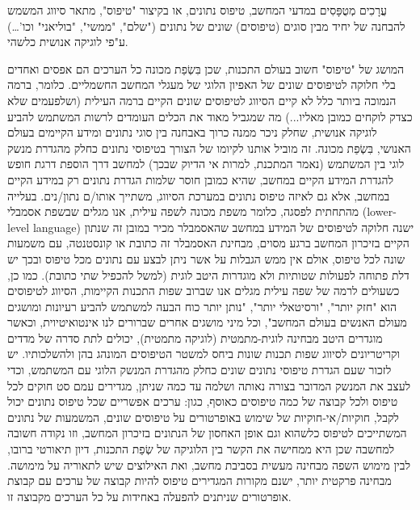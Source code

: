 \begin{טבלא}[!htbp]
      עֲרָכִים מְטֻפָּסִים
      במדעי המחשב, טיפוס נתונים, או בקיצור "טיפוס", מתאר סיווג המשמש להבחנה של יחיד מבין סוגים (טיפוסים) שונים של נתונים ("שלם", "ממשי", "בוליאני" וכו'…) ע"פי לוגיקה אנושית כלשהי.

      המושג של "טיפוס" חשוב בעולם התכנות, שכן בִּשְׂפַת מכונה כל הערכים הם אפסים ואחדים
      בלי חלוקה לטיפוסים שונים של האפיון הלוגי של מעגלי המחשב החשמליים. כלומר, ברמה
      הנמוכה ביותר כלל לא קיים הסיווג לטיפוסים שונים הקיים ברמה העילית (ושלפעמים שלא
      כצדק לוקחים כמובן מאליו...) מה שמגביל מאוד את הכלים העומדים לרשות המשתמש להביע
      לוגיקה אנושית, שחלק ניכר ממנה כרוך באבחנה בין סוגי נתונים ומידע הקיימים בעולם
      האנושי, בִּשְׂפַת מכונה. זה מוביל אותנו לקיומו של הצורך בטיפוסי נתונים כחלק מהגדרת
      מנשק לוגי בין המשתמש (נאמר המתכנת, למרות אי הדיוק שבכך) למחשב דרך הוספת דרגת
      חופש להגדרת המידע הקיים במחשב, שהיא כמובן חוסר שלמות הגדרת נתונים רק במידע
      הקיים במחשב, אלא גם לאיזה טיפוס נתונים במערכת הסיווג, משתייך אותו/ם נתון/נים.
      בעלייה מהתחתית לפסגה, כלומר משפת מכונה לשפה עילית, אנו מגלים שבשפת אסמבלי
      (lower-level language) ישנה חלוקה לטיפוסים של המידע במחשב שהאסמבלר מכיר במובן
      זה שנתון הקיים בזיכרון המחשב ברגע מסוים, מבחינת האסמבלר זה כתובת או קונסטנטה,
      עם משמעות שונה לכל טיפוס, אולם אין ממש הגבלות על אשר ניתן לבצע עם נתונים מכל
      טיפוס ובכך יש דלת פתוחה לפעולות שטותיות ולא מוגדרות היטב לוגית (למשל להכפיל שתי
      כתובת). כמו כן, כשעולים לרמה של שפה עילית מגלים אנו שברוב שפות התכנות הקיימות,
      הסיווג לטיפוסים הוא "חזק יותר", "ורסיטאלי יותר", "נותן יותר כוח הבעה למשתמש
      להביע רעיונות ומושגים מעולם האנשים בעולם המחשב", וכל מיני מושגים אחרים שברורים
      לנו אינטואיטיוית, וכאשר מוגדרים היטב מבחינה לוגית-מתמטית (לוגיקה מתמטית),
      יכולים לתת סדרה של מדדים וקריטריונים לסיווג שפות תכנות שונות ביחס למשטר
      הטיפוסים המונהג בהן ולהשלכותיו. יש לזכור שעם הגדרת טיפוסי נתונים שונים כחלק
      מהגדרת המנשק הלוגי עם המשתמש, וכדי לעצב את המנשק המדובר בצורה נאותה ושלמה עד
      כמה שניתן, מגדירים עמם סט חוקים לכל טיפוס ולכל קבוצה של כמה טיפוסים כאוסף,
      כגון: ערכים אפשריים שכל טיפוס נתונים יכול לקבל, חוקיות/אי-חוקיות של שימוש
      באופרטורים על טיפוסים שונים, המשמעות של נתונים המשתייכים לטיפוס כלשהוא וגם אופן
      האחסון של הנתונים בזיכרון המחשב, וזו נקודה חשובה למחשבה שכן היא ממחישה את הקשר
      בין הלוגיקה של שְׂפַת התכנות, דיון תיאורטי ברובו, לבין מימוש השפה מבחינה מעשית
      בסביבת מחשב, ואת האילוצים שיש לתאוריה על מימושה. מבחינה פרקטית יותר, ישנם
      מקורות המגדירים טיפוס להיות קבוצה של ערכים עם קבוצת אופרטורים שניתנים להפעלה
      באחידות על כל הערכים מקבוצה זו.


\end{טבלא}
